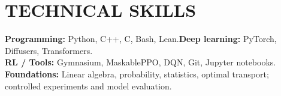 \documentclass[10pt,a4paper]{article}
\begin{document}
\section{TECHNICAL SKILLS}
\textbf{Programming:} Python, C++, C, Bash, Lean.\quad \textbf{Deep learning:} PyTorch, Diffusers, Transformers.\\
\textbf{RL / Tools:} Gymnasium, MaskablePPO, DQN, Git, Jupyter notebooks.\\
\textbf{Foundations:} Linear algebra, probability, statistics, optimal transport; controlled experiments and model evaluation.
\end{document}
